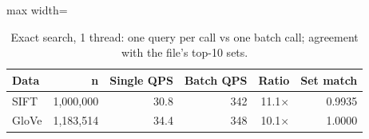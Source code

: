 \begin{table}[!t]
\centering
\footnotesize
\begin{adjustbox}{max width=\linewidth}
\begin{tabular}{lrrrrr}
\toprule
Data & n & Single QPS & Batch QPS & Ratio & Set match \\
\midrule
SIFT & 1,000,000 & 30.8 & 342 & 11.1$\times$ & 0.9935 \\
GloVe & 1,183,514 & 34.4 & 348 & 10.1$\times$ & 1.0000 \\
\bottomrule
\end{tabular}
\end{adjustbox}
\caption{Exact search, 1 thread: one query per call vs one batch call; agreement with the file's top-10 sets.}
\label{tab:part1c}
\end{table}
